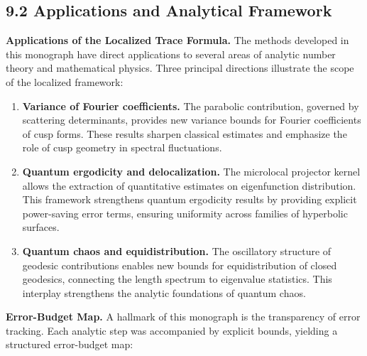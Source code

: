 

\subsection*{9.2 Applications and Analytical Framework}

\noindent\textbf{Applications of the Localized Trace Formula.}
The methods developed in this monograph have direct applications to several
areas of analytic number theory and mathematical physics. Three principal
directions illustrate the scope of the localized framework:

\begin{enumerate}
  \item \textbf{Variance of Fourier coefficients.}  
  The parabolic contribution, governed by scattering determinants,
  provides new variance bounds for Fourier coefficients of cusp forms.
  These results sharpen classical estimates and emphasize the role
  of cusp geometry in spectral fluctuations.

  \item \textbf{Quantum ergodicity and delocalization.}  
  The microlocal projector kernel allows the extraction of quantitative
  estimates on eigenfunction distribution. This framework strengthens
  quantum ergodicity results by providing explicit power-saving error terms,
  ensuring uniformity across families of hyperbolic surfaces.

  \item \textbf{Quantum chaos and equidistribution.}  
  The oscillatory structure of geodesic contributions
  enables new bounds for equidistribution of closed geodesics,
  connecting the length spectrum to eigenvalue statistics.
  This interplay strengthens the analytic foundations of quantum chaos.
\end{enumerate}

\medskip

\noindent\textbf{Error-Budget Map.}
A hallmark of this monograph is the transparency of error tracking.
Each analytic step was accompanied by explicit bounds,
yielding a structured error-budget map:

